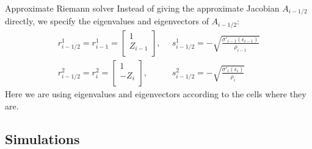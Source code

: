 \documentclass{beamer}
\begin{document}
\begin{frame}{Approximate Riemann solver}
Instead of giving the approximate Jacobian $A_{i-1/2}$ directly, we specify the eigenvalues and eigenvectors of $A_{i-1/2}$:
\begin{align}
r^1_{i-1/2}=r^1_{i-1}=\left[
                        \begin{array}{c}
                          1 \\ Z_{i-1} \\
                        \end{array}
                      \right], & \,\,\, s^1_{i-1/2}=-\sqrt{\frac{\sigma'_{i-1}(\epsilon_{i-1})}{\rho_{i-1}}}\\
r^2_{i-1/2}=r^2_{i}=\left[
                        \begin{array}{c}
                          1 \\ -Z_{i} \\
                        \end{array}
                      \right], &\,\,\, s^2_{i-1/2}=-\sqrt{\frac{\sigma'_{i}(\epsilon_{i})}{\rho_{i}}}
\end{align}
Here we are using eigenvalues and eigenvectors according to the cells where they are.
\end{frame}

\subsection{Simulations}
\end{document}
